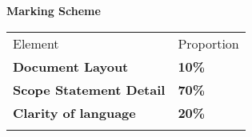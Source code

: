 \textbf{Marking Scheme}

\begin{table}[h!]
     \begin{center}
     \begin{tabular}{p{9cm}  p{3cm} }
     \toprule
      \textbf\large{Element} & \textbf\large{Proportion} \\ 
    \cmidrule(r){1-1}\cmidrule(lr){2-2}
      \textbf{Document Layout} & \textbf{10\%}\\
      \textbf{Scope Statement Detail} & \textbf{70\%}\\
      \textbf{Clarity of language} & \textbf{20\%}\\
      \\ \bottomrule
      \end{tabular}
      \label{tbl:markSchemeAsmt3}
      \end{center}
 \end{table}

